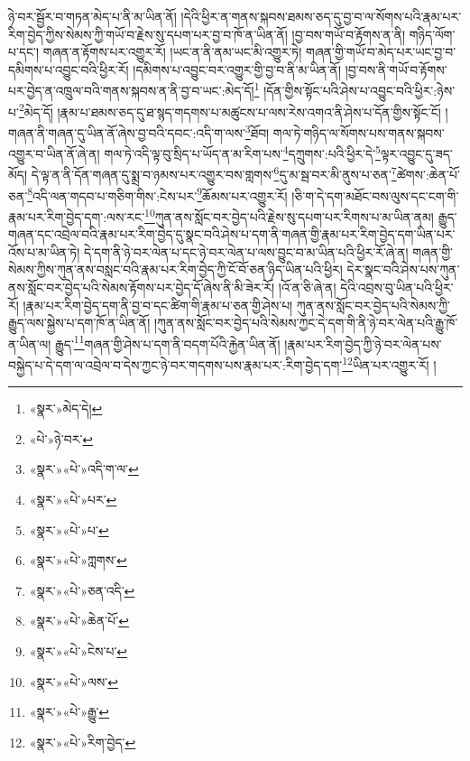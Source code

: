 ཉེ་བར་སྦྱོར་བ་གཏན་མེད་པ་ནི་མ་ཡིན་ནོ། །དེའི་ཕྱིར་ན་གནས་སྐབས་ཐམས་ཅད་དུ་བྱ་བ་ལ་སོགས་པའི་རྣམ་པར་རིག་བྱེད་ཀྱིས་སེམས་ཀྱི་གཡོ་བ་རྗེས་སུ་དཔག་པར་བྱ་བ་ཁོ་ན་ཡིན་ནོ། །བྱ་བས་གཡོ་བ་རྟོགས་ན་ནི། གཉིད་ལོག་པ་དང་། གཞན་ན་རྟོགས་པར་འགྱུར་རོ། །ཡང་ན་ནི་ནམ་ཡང་མི་འགྱུར་ཏེ། གཞན་གྱི་གཡོ་བ་མེད་པར་ཡང་བྱ་བ་དམིགས་པ་འབྱུང་བའི་ཕྱིར་རོ། །དམིགས་པ་འབྱུང་བར་འགྱུར་གྱི་བྱ་བ་ནི་མ་ཡིན་ནོ། །བྱ་བས་ནི་གཡོ་བ་རྟོགས་པར་བྱེད་ན་འཁྲུལ་བའི་གནས་སྐབས་ན་ནི་བྱ་བ་ཡང་:མེད་དོ།\footnote{«སྣར་»མེད་དེ།} །དོན་གྱིས་སྟོང་པའི་ཤེས་པ་འབྱུང་བའི་ཕྱིར་:ཉེས་པ་\footnote{«པེ་»ཉེ་བར་}མེད་དོ། །རྣམ་པ་ཐམས་ཅད་དུ་ཐ་སྙད་གདགས་པ་མཚུངས་པ་ལས་རེས་འགའ་ནི་ཤེས་པ་དོན་གྱིས་སྟོང་ངོ། །གཞན་ནི་གཞན་དུ་ཡིན་ནོ་ཞེས་བྱ་བའི་དབང་:འདི་ག་ལས་\footnote{«སྣར་»«པེ་»འདི་ག་ལ་}ཐོབ། གལ་ཏེ་གཉིད་ལ་སོགས་པས་གནས་སྐབས་འགྱུར་བ་ཡིན་ནོ་ཞེ་ན། གལ་ཏེ་འདི་ལྟ་བུ་སྲིད་པ་ཡོད་ན་མ་རིག་པས་\footnote{«སྣར་»«པེ་»པར་}དཀྲུགས་:པའི་ཕྱིར་དེ་\footnote{«སྣར་»«པེ་»པ་}ལྟར་འབྱུང་དུ་ཟད་མོད། དེ་ལྟ་ན་ནི་དོན་གཞན་དུ་སྨྲ་བ་ཉམས་པར་འགྱུར་བས་གླགས་\footnote{«སྣར་»«པེ་»ཀླགས་}དུ་མ་སྦ་བར་མི་ནུས་པ་ཅན་\footnote{«སྣར་»«པེ་»ཅན་འདི་}ཚེགས་:ཆེན་པོ་ཅན་\footnote{«སྣར་»«པེ་»ཆེན་པོ་}འདི་ལན་གདབ་པ་གཅིག་གིས་:ངེས་པར་\footnote{«སྣར་»«པེ་»ངེས་པ་}ཆོམས་པར་འགྱུར་རོ། །ཅི་ག་དེ་དག་མཐོང་བས་ལུས་དང་ངག་གི་རྣམ་པར་རིག་བྱེད་དག་:ལས་རང་\footnote{«སྣར་»«པེ་»ལས་}ཀུན་ནས་སློང་བར་བྱེད་པའི་རྗེས་སུ་དཔག་པར་རིགས་པ་མ་ཡིན་ནམ། རྒྱུད་གཞན་དང་འབྲེལ་བའི་རྣམ་པར་རིག་བྱེད་དུ་སྣང་བའི་ཤེས་པ་དག་ནི་གཞན་གྱི་རྣམ་པར་རིག་བྱེད་དག་ཡིན་པར་འོས་པ་མ་ཡིན་ཏེ། དེ་དག་ནི་ཉེ་བར་ལེན་པ་དང་ཉེ་བར་ལེན་པ་ལས་བྱུང་བ་མ་ཡིན་པའི་ཕྱིར་རོ་ཞེ་ན། གཞན་གྱི་སེམས་ཀྱིས་ཀུན་ནས་བསླང་བའི་རྣམ་པར་རིག་བྱེད་ཀྱི་ངོ་བོ་ཅན་ཉིད་ཡིན་པའི་ཕྱིར། དེར་སྣང་བའི་ཤེས་པས་ཀུན་ནས་སློང་བར་བྱེད་པའི་སེམས་རྟོགས་པར་བྱེད་དོ་ཞེས་ནི་མི་ཟེར་རོ། །འོ་ན་ཅི་ཞེ་ན། དེའི་འབྲས་བུ་ཡིན་པའི་ཕྱིར་རོ། །རྣམ་པར་རིག་བྱེད་དག་ནི་བྱ་བ་དང་ཚིག་གི་རྣམ་པ་ཅན་གྱི་ཤེས་པ། ཀུན་ནས་སློང་བར་བྱེད་པའི་སེམས་ཀྱི་རྒྱུད་ལས་སྐྱེས་པ་དག་ཁོ་ན་ཡིན་ནོ། །ཀུན་ནས་སློང་བར་བྱེད་པའི་སེམས་ཀྱང་དེ་དག་གི་ནི་ཉེ་བར་ལེན་པའི་རྒྱུ་ཁོ་ན་ཡིན་ལ། རྒྱུད་\footnote{«སྣར་»«པེ་»རྒྱུ་}གཞན་གྱི་ཤེས་པ་དག་ནི་བདག་པོའི་རྐྱེན་ཡིན་ནོ། །རྣམ་པར་རིག་བྱེད་ཀྱི་ཉེ་བར་ལེན་པས་བསྐྱེད་པ་དེ་དག་ལ་འབྲེལ་བ་དེས་ཀྱང་ཉེ་བར་གདགས་པས་རྣམ་པར་:རིག་བྱེད་དག་\footnote{«སྣར་»«པེ་»རིག་བྱེད་}ཡིན་པར་འགྱུར་རོ། །

